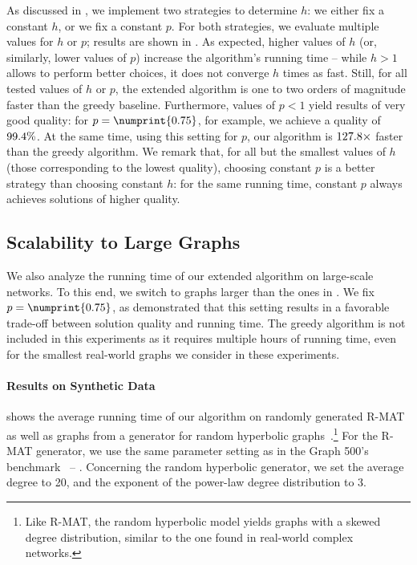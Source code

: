 As discussed in , we implement two strategies
to determine $h$: we either fix a constant $h$, or we fix
a constant $p$. For both strategies, we evaluate multiple values for
$h$ or $p$; results are shown in . As expected, higher
values of $h$ (or, similarly, lower values of $p$) increase the algorithm's
running time -- while $h > 1$ allows \growshrink to perform better choices,
it does not converge $h$ times as fast.
%
Still, for all tested values of $h$ or $p$, the extended \growshrink algorithm
is one to two orders of magnitude faster than the greedy baseline. Furthermore,
values of $p < 1$ yield results of very good quality: for $p = \numprint{0.75}$,
for example, we achieve a quality of $\onedigit{\gsPSevenFiveKQualNum}\%$.
%
At the same time, using this setting for $p$, our algorithm is
$\onedigit{\gsPSevenFiveKSpeed}\times$ faster than the greedy algorithm.
We remark that, for all but the smallest values of $h$ (\ie those
corresponding to the lowest quality), choosing constant $p$ is a better
strategy than choosing constant $h$: for the same running time,
constant $p$ always achieves solutions of higher quality.


\subsection{Scalability to Large Graphs}
%
\begin{table}
\label{tab:lsh-gc-heu-time-large}
\centering\smallskip\footnotesize


\end{table}

We also analyze the running time of our extended \growshrink algorithm
on large-scale networks. To this end, we switch to graphs larger than
the ones in . We fix $p = \numprint{0.75}$,
as  demonstrated that this setting results
in a favorable trade-off between solution quality and running time.
%
The greedy algorithm is not included in this experiments as it requires
multiple hours of running time, even for the smallest real-world graphs
we consider in these experiments.

\paragraph{Results on Synthetic Data}
%
 shows the average running time of our algorithm
on randomly generated R-MAT~\cite{DBLP:conf/sdm/ChakrabartiZF04} as well as
graphs from a generator for random hyperbolic
graphs~\cite{DBLP:conf/hpec/LoozOLM16}.\footnote{Like R-MAT, the random
hyperbolic model yields graphs with a skewed degree distribution, similar to
the one found in real-world complex networks.} For the R-MAT generator, we use
the same parameter setting as in
the Graph 500's benchmark~\cite{murphy2010introducing}
-- \ie \graphfh. Concerning the random hyperbolic
generator, we set the average degree to 20, and the exponent of the power-law
degree distribution to 3.

